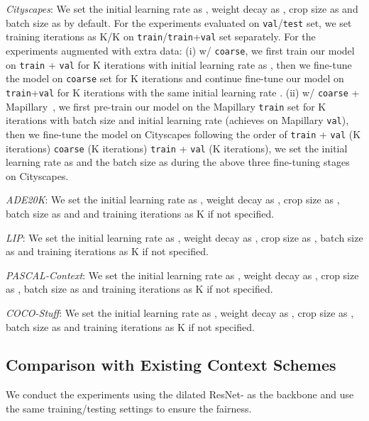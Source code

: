 \documentclass[runningheads]{llncs}
\begin{document}
\noindent \emph{Cityscapes}: 
We set the initial learning rate as , weight decay as , crop size as  and batch size as  by default.
For the experiments evaluated on \texttt{val}/\texttt{test} set,
we set training iterations as K/K on \texttt{train}/\texttt{train}+\texttt{val}
set separately.
For the experiments augmented with extra data:
(i) w/ \texttt{coarse},
we first train our model on \texttt{train} + \texttt{val} for K iterations
with initial learning rate as ,
then we fine-tune the model on \texttt{coarse} set
for K iterations and continue fine-tune our model on
\texttt{train}+\texttt{val} for K iterations with
the same initial learning rate .
(ii) w/ \texttt{coarse} + Mapillary~\cite{neuhold2017mapillary},
we first pre-train our model on the Mapillary \texttt{train} set
for K iterations with batch size  and initial learning rate  (achieves  on Mapillary \texttt{val}),
then we fine-tune the model on Cityscapes following the order of \texttt{train} + \texttt{val} (K iterations)  \texttt{coarse} (K iterations)  \texttt{train} + \texttt{val} (K iterations),
we set the initial learning rate as  and the batch size as 
during the above three fine-tuning stages on Cityscapes.


\noindent \emph{ADE20K}: 
We set the initial learning rate as , weight decay as , crop size as , batch size as  and and training iterations as K if not specified.

\noindent \emph{LIP}: 
We set the initial learning rate as , weight decay as , crop size as , batch size as  and training iterations as K if not specified.

\noindent \emph{PASCAL-Context}: We set the initial learning rate as , weight decay as , crop size as , batch size as  and training iterations as K if not specified.

\noindent \emph{COCO-Stuff}: We set the initial learning rate as , weight decay as , crop size as , batch size as  and training iterations as K if not specified.

\subsection{Comparison with Existing Context Schemes}
We conduct the experiments using the dilated ResNet- as the backbone and use the same training/testing settings to ensure the fairness.
\end{document}

